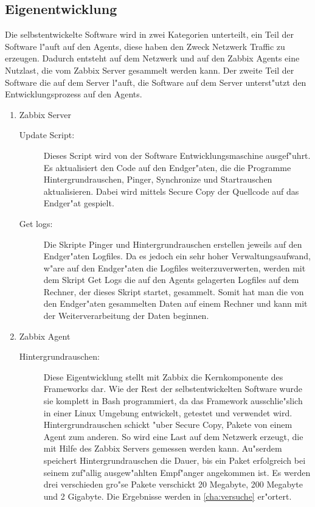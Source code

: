 \subsection{Eigenentwicklung}
Die selbstentwickelte Software wird in zwei Kategorien unterteilt, ein Teil der Software l"auft %
auf den Agents, diese haben den Zweck Netzwerk Traffic zu erzeugen. Dadurch entsteht auf dem Netzwerk und %
auf den Zabbix Agents eine Nutzlast, die vom Zabbix Server gesammelt werden kann. Der zweite Teil der Software %
die auf dem Server l"auft, die Software auf dem Server unterst"utzt den Entwicklungsprozess auf den Agents. %
\begin{enumerate}
\item Zabbix Server 
\begin{description}
\item[Update Script:]Dieses Script wird von der Software Entwicklungsmaschine ausgef"uhrt. Es aktualisiert den Code auf den Endger"aten, %
die die Programme Hintergrundrauschen, Pinger, Synchronize und Startrauschen aktualisieren. Dabei wird mittels Secure Copy %
der Quellcode auf das Endger"at gespielt.

\item[Get logs:]Die Skripte Pinger und Hintergrundrauschen erstellen jeweils auf den Endger"aten Logfiles. %
Da es jedoch ein sehr hoher Verwaltungsaufwand, w"are auf den Endger"aten die Logfiles weiterzuverwerten, %
werden mit dem Skript Get Logs die auf den Agents gelagerten Logfiles auf dem Rechner, der dieses Skript %
startet, gesammelt. Somit hat man die von den Endger"aten gesammelten Daten auf einem Rechner und kann %
mit der Weiterverarbeitung der Daten beginnen.      

\end{description}

\item Zabbix Agent

\begin{description}
\item[Hintergrundrauschen:]Diese Eigentwicklung stellt mit Zabbix die Kernkomponente des Frameworks dar. Wie %
der Rest der selbstentwickelten Software wurde sie komplett in Bash programmiert, da das Framework ausschlie"slich %
in einer Linux Umgebung entwickelt, getestet und verwendet wird. Hintergrundrauschen schickt "uber Secure Copy, %
Pakete von einem Agent zum anderen. So wird eine %
Last auf dem Netzwerk erzeugt, die mit Hilfe des Zabbix Servers gemessen werden kann. Au"serdem speichert Hintergrundrauschen %
die Dauer, bis ein Paket erfolgreich bei seinem zuf"allig ausgew"ahlten Empf"anger angekommen ist. %
Es werden drei verschieden gro"se Pakete verschickt 20 Megabyte, 200 Megabyte und 2 Gigabyte. %
Die Ergebnisse werden in \cref{cha:versuche} er"ortert.


\end{description}
\end{enumerate}
